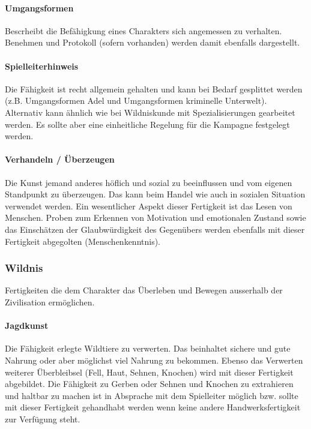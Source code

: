 \documentclass{article}
\begin{document}
\paragraph{Umgangsformen}

Bescrheibt die Befähigkung eines Charakters sich angemessen zu verhalten. Benehmen und Protokoll (sofern vorhanden)
werden damit ebenfalls dargestellt.

\begin{mdframed}[hidealllines=true, backgroundcolor=black!10]
\paragraph{Spielleiterhinweis}

Die Fähigkeit ist recht allgemein gehalten und kann bei Bedarf gesplittet werden (z.B. Umgangsformen Adel und
Umgangsformen kriminelle Unterwelt). Alternativ kann ähnlich wie bei Wildniskunde mit Spezialisierungen gearbeitet
werden. Es sollte aber eine einheitliche Regelung für die Kampagne festgelegt werden.

\end{mdframed}
\paragraph{Verhandeln / Überzeugen}

Die Kunst jemand anderes höflich und sozial zu beeinflussen und vom eigenen Standpunkt zu überzeugen. Das kann beim
Handel wie auch in sozialen Situation verwendet werden. Ein wesentlicher Aspekt dieser Fertigkeit ist das Lesen von
Menschen. Proben zum Erkennen von Motivation und emotionalen Zustand sowie das Einschätzen der Glaubwürdigkeit des
Gegenübers werden ebenfalls mit dieser Fertigkeit abgegolten (Menschenkenntnis).

\subsubsection{Wildnis}

Fertigkeiten die dem Charakter das Überleben und Bewegen ausserhalb der Zivilisation ermöglichen.

\paragraph{Jagdkunst}

Die Fähigkeit erlegte Wildtiere zu verwerten. Das beinhaltet sichere und gute Nahrung oder aber möglichst viel
Nahrung zu bekommen. Ebenso das Verwerten weiterer Überbleibsel (Fell, Haut, Sehnen, Knochen) wird mit dieser
Fertigkeit abgebildet. Die Fähigkeit zu Gerben oder Sehnen und Knochen zu extrahieren und haltbar zu machen ist
in Absprache mit dem Spielleiter möglich bzw. sollte mit dieser Fertigkeit gehandhabt werden wenn keine andere
Handwerksfertigkeit zur Verfügung steht.
\end{document}
